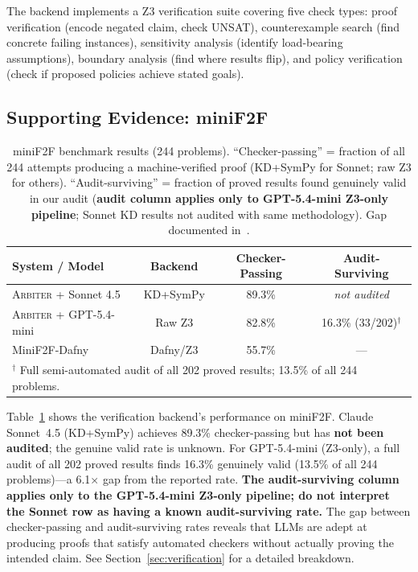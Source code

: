 \documentclass[11pt]{article}
\newcommand{\arbiter}{\textsc{Arbiter}}
\begin{document}
The backend implements a Z3 verification suite covering five check types: proof verification (encode negated claim, check UNSAT), counterexample search (find concrete failing instances), sensitivity analysis (identify load-bearing assumptions), boundary analysis (find where results flip), and policy verification (check if proposed policies achieve stated goals).

\subsection{Supporting Evidence: miniF2F}

\begin{table}[t]
\centering
\caption{miniF2F benchmark results (244 problems). ``Checker-passing'' = fraction of all 244 attempts producing a machine-verified proof (KD+SymPy for Sonnet; raw Z3 for others). ``Audit-surviving'' = fraction of proved results found genuinely valid in our audit (\textbf{audit column applies only to GPT-5.4-mini Z3-only pipeline}; Sonnet KD results not audited with same methodology). Gap documented in~\cite{arbiterpaperA}.}
\label{tab:minif2f}
\begin{tabular}{@{}lccc@{}}
\toprule
\textbf{System / Model} & \textbf{Backend} & \textbf{Checker-Passing} & \textbf{Audit-Surviving} \\
\midrule
\arbiter{} + Sonnet 4.5 & KD+SymPy & 89.3\% & \textit{not audited} \\
\arbiter{} + GPT-5.4-mini & Raw Z3 & 82.8\% & 16.3\% (33/202)$^\dag$ \\
\midrule
MiniF2F-Dafny & Dafny/Z3 & 55.7\% & --- \\
\midrule
\multicolumn{4}{l}{$^\dag$ Full semi-automated audit of all 202 proved results; 13.5\% of all 244 problems.} \\
\bottomrule
\end{tabular}
\end{table}

Table~\ref{tab:minif2f} shows the verification backend's performance on miniF2F.
Claude Sonnet~4.5 (KD+SymPy) achieves 89.3\% checker-passing but has \textbf{not been audited}; the genuine valid rate is unknown.
For GPT-5.4-mini (Z3-only), a full audit of all 202 proved results finds 16.3\% genuinely valid (13.5\% of all 244 problems)---a 6.1$\times$ gap from the reported rate.
\textbf{The audit-surviving column applies only to the GPT-5.4-mini Z3-only pipeline; do not interpret the Sonnet row as having a known audit-surviving rate.}
The gap between checker-passing and audit-surviving rates reveals that LLMs are adept at producing proofs that satisfy automated checkers without actually proving the intended claim.
See Section~\ref{sec:verification} for a detailed breakdown.
\end{document}
